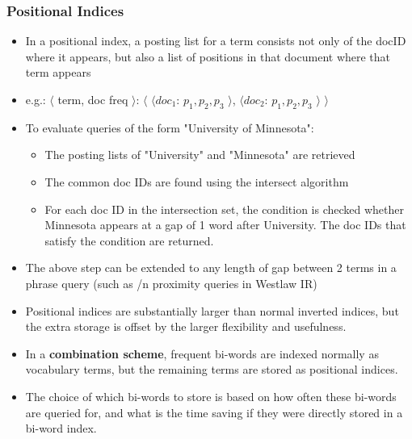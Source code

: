 \documentclass{article}
\begin{document}
\subsubsection{Positional Indices}
\begin{itemize}
    \item In a positional index, a posting list for a term consists not only of the docID where it appears, but also a list of positions in that document where that term appears
    
    \item e.g.: $\langle$ term, doc freq $\rangle$: $\langle$ $\langle doc_1$: $p_1, p_2, p_3$ $\rangle$, $\langle doc_2$: $p_1, p_2, p_3$ $\rangle$ $\rangle$
    
    \item To evaluate queries of the form "University of Minnesota":
    \begin{itemize}
        \item The posting lists of "University" and "Minnesota" are retrieved
        
        \item The common doc IDs are found using the intersect algorithm
        
        \item For each doc ID in the intersection set, the condition is checked whether Minnesota appears at a gap of 1 word after University. The doc IDs that satisfy the condition are returned. 
    \end{itemize}
    
    \item The above step can be extended to any length of gap between 2 terms in a phrase query (such as /n proximity queries in Westlaw IR)
    
    \item Positional indices are substantially larger than normal inverted indices, but the extra storage is offset by the larger flexibility and usefulness. 
    
    \item In a \textbf{combination scheme}, frequent bi-words are indexed normally as vocabulary terms, but the remaining terms are stored as positional indices. 
    \item The choice of which bi-words to store is based on how often these bi-words are queried for, and what is the time saving if they were directly stored in a bi-word index. 
\end{itemize}
\end{document}
